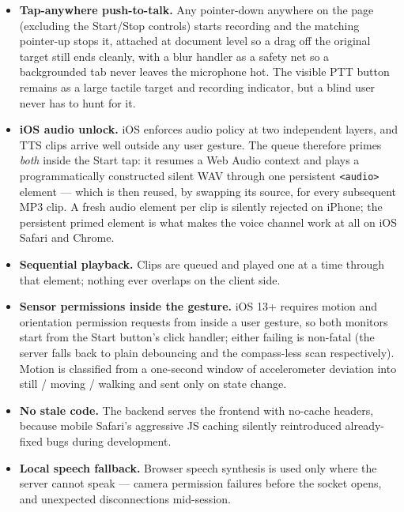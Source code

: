 \begin{itemize}[nosep]
  \item \textbf{Tap-anywhere push-to-talk.} Any pointer-down anywhere on the page
        (excluding the Start/Stop controls) starts recording and the matching
        pointer-up stops it, attached at document level so a drag off the
        original target still ends cleanly, with a blur handler as a safety net
        so a backgrounded tab never leaves the microphone hot. The visible PTT
        button remains as a large tactile target and recording indicator, but a
        blind user never has to hunt for it.
  \item \textbf{iOS audio unlock.} iOS enforces audio policy at two independent
        layers, and TTS clips arrive well outside any user gesture. The queue
        therefore primes \emph{both} inside the Start tap: it resumes a Web Audio
        context and plays a programmatically constructed silent WAV through one
        persistent \texttt{<audio>} element --- which is then reused, by swapping
        its source, for every subsequent MP3 clip. A fresh audio element per clip
        is silently rejected on iPhone; the persistent primed element is what
        makes the voice channel work at all on iOS Safari and Chrome.
  \item \textbf{Sequential playback.} Clips are queued and played one at a time
        through that element; nothing ever overlaps on the client side.
  \item \textbf{Sensor permissions inside the gesture.} iOS 13+ requires motion
        and orientation permission requests from inside a user gesture, so both
        monitors start from the Start button's click handler; either failing is
        non-fatal (the server falls back to plain debouncing and the compass-less
        scan respectively). Motion is classified from a one-second window of
        accelerometer deviation into still / moving / walking and sent only on
        state change.
  \item \textbf{No stale code.} The backend serves the frontend with
        no-cache headers, because mobile Safari's aggressive JS caching silently
        reintroduced already-fixed bugs during development.
  \item \textbf{Local speech fallback.} Browser speech synthesis is used only
        where the server cannot speak --- camera permission failures before the
        socket opens, and unexpected disconnections mid-session.
\end{itemize}

